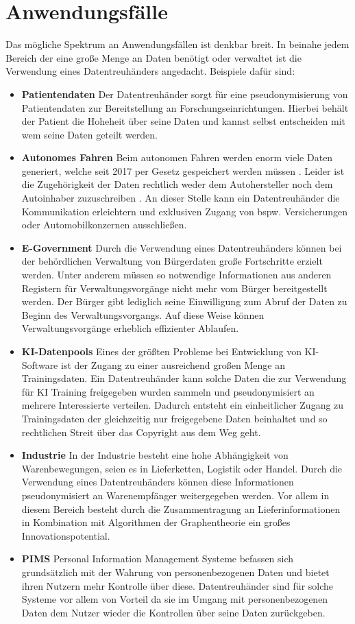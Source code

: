 \documentclass[11pt,a4paper]{scrreprt}
\begin{document}
\section{Anwendungsfälle}
\label{sec:dt-usecases}
Das mögliche Spektrum an Anwendungsfällen ist denkbar breit. In beinahe jedem Bereich der eine große Menge an Daten benötigt oder verwaltet ist die Verwendung eines Datentreuhänders angedacht. Beispiele dafür sind:
\begin{itemize}
    \item \textbf{Patientendaten} Der Datentreuhänder sorgt für eine pseudonymisierung von Patientendaten zur Bereitstellung an Forschungseinrichtungen. Hierbei behält der Patient die Hoheheit über seine Daten und kannst selbst entscheiden mit wem seine Daten geteilt werden.
    \item \textbf{Autonomes Fahren} Beim autonomen Fahren werden enorm viele Daten generiert, welche seit 2017 per Gesetz gespeichert werden müssen \cite{dt-bundesdruckereiDatentreuhänder}. Leider ist die Zugehörigkeit der Daten rechtlich weder dem Autohersteller noch dem Autoinhaber zuzuschreiben \cite{dt-richter2020ddvtalk}. An dieser Stelle kann ein Datentreuhänder die Kommunikation erleichtern und exklusiven Zugang von bspw. Versicherungen oder Automobilkonzernen ausschließen.
    \item \textbf{E-Government} Durch die Verwendung eines Datentreuhänders können bei der behördlichen Verwaltung von Bürgerdaten große Fortschritte erzielt werden. Unter anderem müssen so notwendige Informationen aus anderen Registern für Verwaltungsvorgänge nicht mehr vom Bürger bereitgestellt werden. Der Bürger gibt lediglich seine Einwilligung zum Abruf der Daten zu Beginn des Verwaltungsvorgangs. Auf diese Weise können Verwaltungsvorgänge erheblich effizienter Ablaufen.
    \item \textbf{KI-Datenpools} Eines der größten Probleme bei Entwicklung von KI-Software ist der Zugang zu einer ausreichend großen Menge an Trainingsdaten. Ein Datentreuhänder kann solche Daten die zur Verwendung für KI Training freigegeben wurden sammeln und pseudonymisiert an mehrere Interessierte verteilen. Dadurch entsteht ein einheitlicher Zugang zu Trainingsdaten der gleichzeitig nur freigegebene Daten beinhaltet und so rechtlichen Streit über das Copyright aus dem Weg geht.
    \item \textbf{Industrie} In der Industrie besteht eine hohe Abhängigkeit von Warenbewegungen, seien es in Lieferketten, Logistik oder Handel. Durch die Verwendung eines Datentreuhänders können diese Informationen pseudonymisiert an Warenempfänger weitergegeben werden. Vor allem in diesem Bereich besteht durch die Zusammentragung an Lieferinformationen in Kombination mit Algorithmen der Graphentheorie ein großes Innovationspotential.
    \item \textbf{PIMS} Personal Information Management Systeme befassen sich grundsätzlich mit der Wahrung von personenbezogenen Daten und bietet ihren Nutzern mehr Kontrolle über diese.  Datentreuhänder sind für solche Systeme vor allem von Vorteil da sie im Umgang mit personenbezogenen Daten dem Nutzer wieder die Kontrollen über seine Daten zurückgeben.
\end{itemize}
\end{document}
